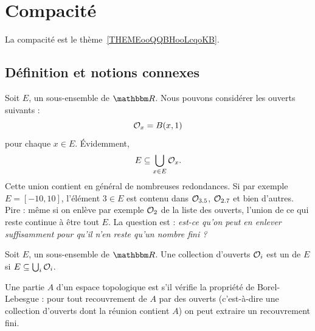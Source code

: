 \section{Compacité}

La compacité est le thème~\ref{THEMEooQQBHooLcqoKB}.

\subsection{Définition et notions connexes}

Soit $E$, un sous-ensemble de $\eR$. Nous pouvons considérer les ouverts suivants :
\begin{equation}
    \mathcal{O}_x=B(x,1)
\end{equation}
pour chaque $x\in E$. Évidemment,
\begin{equation}
    E\subseteq \bigcup_{x\in E}\mathcal{O}_x.
\end{equation}
Cette union contient en général de nombreuses redondances. Si par exemple $E=[-10,10]$, l'élément $3\in E$ est contenu dans $\mathcal{O}_{3.5}$, $\mathcal{O}_{2.7}$ et bien d'autres. Pire : même si on enlève par exemple $\mathcal{O}_2$ de la liste des ouverts, l'union de ce qui reste continue à être tout $E$. La question est : \emph{est-ce qu'on peut en enlever suffisamment pour qu'il n'en reste qu'un nombre fini ?}

\begin{definition} 
Soit $E$, un sous-ensemble de $\eR$. Une collection d'ouverts $\mathcal{O}_i$ est un  de $E$ si $E\subseteq \bigcup_{i}\mathcal{O}_i$.
\end{definition}

\begin{definition} \label{DefJJVsEqs}
    Une partie $A$ d'un espace topologique est  s'il vérifie la propriété de Borel-Lebesgue : pour tout recouvrement de $A$ par des ouverts (c'est-à-dire une collection d'ouverts dont la réunion contient $A$) on peut extraire un recouvrement fini.
\end{definition}

